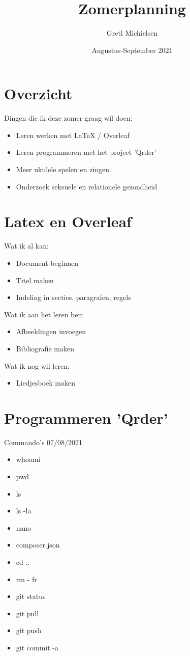 \documentclass{article}
\title{Zomerplanning}
\author{Gretl Michielsen}
\date{Augustus-September 2021}
\begin{document}
\maketitle

\section{Overzicht}
Dingen die ik deze zomer graag wil doen:
\begin{itemize}
    \item Leren werken met LaTeX / Overleaf
    \item Leren programmeren met het project 'Qrder'
    \item Meer ukulele spelen en zingen
    \item Onderzoek seksuele en relationele gezondheid
\end{itemize}

\section{Latex en Overleaf}
Wat ik al kan:
\begin{itemize}
    \item Document beginnen
    \item Titel maken
    \item Indeling in secties, paragrafen, regels
\end{itemize}
\noindent
Wat ik aan het leren ben:
\begin{itemize}
    \item Afbeeldingen invoegen
    \item Bibliografie maken
\end{itemize}
\noindent
Wat ik nog wil leren:
\begin{itemize}
    \item Liedjesboek maken 
\end{itemize}

\section{Programmeren 'Qrder'}
Commando's 07/08/2021
\begin{multicols}{2}
\begin{itemize}
    \item whoami
    \item pwd
    \item ls
    \item ls -la
    \item nano
    \item composer.json
    \item cd ..
    \item rm - fr
    \item git status
    \item git pull
    \item git push
    \item git commit -a
\end{itemize}
\end{multicols}
\end{document}
